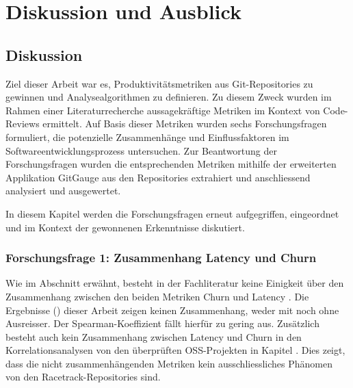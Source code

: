 


\chapter{Diskussion und Ausblick} %

\label{Chapter5} %


\section{Diskussion}
Ziel dieser Arbeit war es, Produktivitätsmetriken aus Git-Repositories zu gewinnen und Analysealgorithmen zu definieren.  Zu diesem Zweck wurden im Rahmen einer Literaturrecherche aussagekräftige Metriken im Kontext von Code-Reviews ermittelt. Auf Basis dieser Metriken wurden sechs Forschungsfragen formuliert, die potenzielle Zusammenhänge und Einflussfaktoren im Softwareentwicklungsprozess untersuchen. Zur Beantwortung der Forschungsfragen wurden die entsprechenden Metriken mithilfe der erweiterten Applikation GitGauge aus den Repositories extrahiert und anschliessend analysiert und ausgewertet.

In diesem Kapitel werden die Forschungsfragen erneut aufgegriffen, eingeordnet und im Kontext der gewonnenen Erkenntnisse diskutiert.



\subsection{Forschungsfrage 1: Zusammenhang Latency und Churn}
Wie im Abschnitt  erwähnt, besteht in der Fachliteratur keine Einigkeit über den Zusammenhang zwischen den beiden Metriken Churn und Latency \parencite{yu_wait_2015}\parencite{hasan_understanding_2023}\parencite{kudrjavets_small_2022}.
Die Ergebnisse () dieser Arbeit zeigen keinen Zusammenhang, weder mit noch ohne Ausreisser. Der Spearman-Koeffizient fällt hierfür zu gering aus. 
Zusätzlich besteht auch kein Zusammenhang zwischen Latency und Churn in den Korrelationsanalysen von den überprüften OSS-Projekten in Kapitel . Dies zeigt, dass die nicht zusammenhängenden Metriken kein ausschliessliches Phänomen von den Racetrack-Repositories sind.

